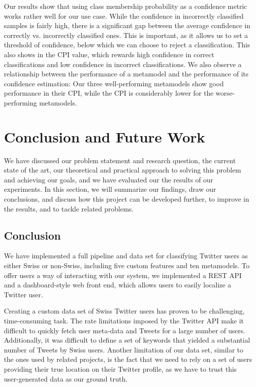 \documentclass[10pt,a4paper]{article}
\begin{document}
Our results show that using class membership probability as a confidence metric works rather well for our use case. While the confidence in incorrectly classified samples is fairly high, there is a significant gap between the average confidence in correctly vs. incorrectly classified ones. This is important, as it allows us to set a threshold of confidence, below which we can choose to reject a classification. This also shows in the CPI value, which rewards high confidence in correct classifications and low confidence in incorrect classifications. We also observe a relationship between the performance of a metamodel and the performance of its confidence estimation: Our three well-performing metamodels show good performance in their CPI, while the CPI is considerably lower for the worse-performing metamodels.

\section{Conclusion and Future Work}
We have discussed our problem statement and research question, the current state of the art, our theoretical and practical approach to solving this problem and achieving our goals, and we have evaluated our the results of our experiments. In this section, we will summarize our findings, draw our conclusions, and discuss how this project can be developed further, to improve in the results, and to tackle related problems.

\subsection{Conclusion}
We have implemented a full pipeline and data set for classifying Twitter users as either Swiss or non-Swiss, including five custom features and ten metamodels. To offer users a way of interacting with our system, we implemented a REST API and a dashboard-style web front end, which allows users to easily localize a Twitter user.

Creating a custom data set of Swiss Twitter users has proven to be challenging, time-consuming task. The rate limitations imposed by the Twitter API make it difficult to quickly fetch user meta-data and Tweets for a large number of users. Additionally, it was difficult to define a set of keywords that yielded a substantial number of Tweets by Swiss users. Another limitation of our data set, similar to the ones used by related projects, is the fact that we need to rely on a set of users providing their true location on their Twitter profile, as we have to trust this user-generated data as our ground truth.
\end{document}
